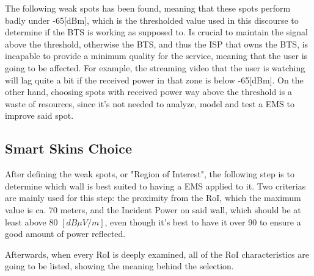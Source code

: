 The following weak spots has been found, meaning that these spots
perform badly under -65{[}dBm{]}, which is the thresholded value used
in this discourse to determine if the BTS is working as supposed to.
Is crucial to maintain the signal above the threshold, otherwise the
BTS, and thus the ISP that owns the BTS, is incapable to provide a
minimum quality for the service, meaning that the user is going to
be affected. For example, the streaming video that the user is watching
will lag quite a bit if the received power in that zone is below -65{[}dBm{]}.
On the other hand, choosing spots with received power way above the
threshold is a waste of resources, since it's not needed to analyze,
model and test a EMS to improve said spot.


\subsection{Smart Skins Choice}

After defining the weak spots, or "Region of Interest",
the following step is to determine which wall is best suited to having
a EMS applied to it. Two criterias are mainly used for this step:
the proximity from the RoI, which the maximum value is ca. 70 meters,
and the Incident Power on said wall, which should be at least above
80 $[dB \mu V/m]$, even though it's best to have it over 90 to ensure a
good amount of power reflected. 

Afterwards, when every RoI is deeply examined, all of the RoI characteristics
are going to be listed, showing the meaning behind the selection. 

